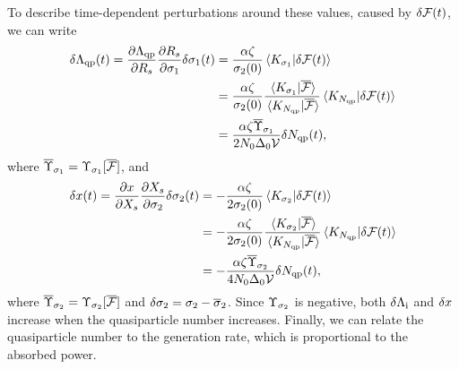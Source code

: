 To describe time-dependent perturbations around these values, caused by $\delta\mathcal{F}(t)$, we can write
\begin{align}
\begin{split}
\delta\Lambda_{\mathrm{qp}}(t)
  =
  \pdv{\Lambda_{\mathrm{qp}}}{R_s}
  \pdv{R_s}{\sigma_1}
  \delta\sigma_1(t)
  &=
  \frac{\alpha \zeta}{\sigma_2(0)}
  \braket*{K_{\sigma_1}}{\delta\mathcal{F}(t)} \\
  &=
  \frac{\alpha \zeta}{\sigma_2(0)}
  \frac
  {\braket*{K_{\sigma_1}}{\overline{\mathcal{F}}}}
  {\braket*{K_{N_{\mathrm{qp}}}}{\overline{\mathcal{F}}}}
  \braket*{K_{N_{\mathrm{qp}}}}{\delta\mathcal{F}(t)} \\
  &=
  \frac{\alpha \zeta \overline{\Upsilon}_{\sigma_1}}{2 N_0 \Delta_0 \mathcal{V}} \delta N_{\mathrm{qp}}(t),
\end{split}
\end{align}
where $\overline{\Upsilon}_{\sigma_1} = \Upsilon_{\sigma_1}[\overline{\mathcal{F}}]$, and
\begin{align}
\begin{split}
\delta x(t)
  =
  \pdv{x}{X_s}
  \pdv{X_s}{\sigma_2}
  \delta\sigma_2(t)
  &=
  -\frac{\alpha \zeta}{2 \sigma_2(0)}
  \braket*{K_{\sigma_2}}{\delta\mathcal{F}(t)} \\
  &=
  -\frac{\alpha \zeta}{2 \sigma_2(0)}
  \frac
  {\braket*{K_{\sigma_2}}{\overline{\mathcal{F}}}}
  {\braket*{K_{N_{\mathrm{qp}}}}{\overline{\mathcal{F}}}}
  \braket*{K_{N_{\mathrm{qp}}}}{\delta\mathcal{F}(t)} \\
  &=
  -\frac{\alpha \zeta \overline{\Upsilon}_{\sigma_2}}{4 N_0 \Delta_0 \mathcal{V}} \delta N_{\mathrm{qp}}(t),
\end{split}
\end{align}
where
$\overline{\Upsilon}_{\sigma_2} = \Upsilon_{\sigma_2}[\overline{\mathcal{F}}]$
and 
$\delta\sigma_2 = \sigma_2 - \overline{\sigma}_2$.
Since $\Upsilon_{\sigma_2}$ is negative, both $\delta\Lambda_{\mathrm{i}}$ and $\delta x$ increase when the quasiparticle number increases.
Finally, we can relate the quasiparticle number to the generation rate, which is proportional to the absorbed power.
